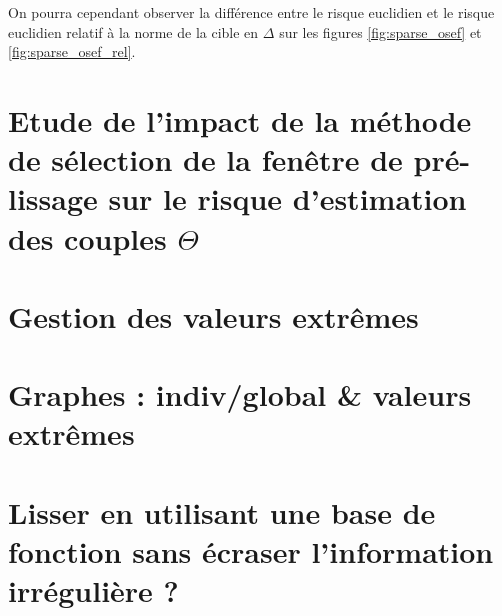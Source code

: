 On pourra cependant observer la différence entre le risque euclidien et le risque euclidien relatif à la norme de la cible en $\Delta$ sur les figures \ref{fig:sparse_osef} et \ref{fig:sparse_osef_rel}.

\section{Etude de l'impact de la méthode de sélection de la fenêtre de pré-lissage sur le risque d'estimation des couples $\Theta$}


% 




\section{Gestion des valeurs extrêmes}


\section{Graphes : indiv/global \& valeurs extrêmes}
\pagebreak




% 
\section{Lisser en utilisant une base de fonction sans écraser l'information irrégulière ?}
\label{annexe:lissage_base_fcn}

